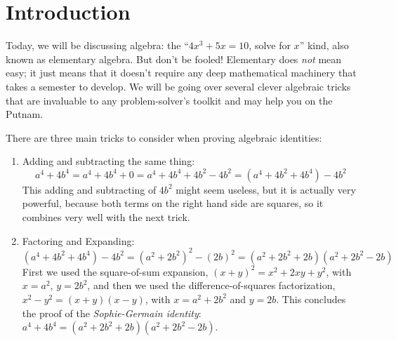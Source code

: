\documentclass{article}
\theoremstyle{definition}
\theoremstyle{remark}
\begin{document}
\section{Introduction}
Today, we will be discussing algebra: the ``$4x^3+5x=10$, solve for $x$'' kind, also known as elementary algebra. But don't be fooled! Elementary does \emph{not} mean easy; it just means that it doesn't require any deep mathematical machinery that takes a semester to develop. We will be going over several clever algebraic tricks that are invaluable to any problem-solver's toolkit and may help you on the Putnam.

There are three main tricks to consider when proving algebraic identities:
\begin{enumerate}[label=\Roman*.]
    \item Adding and subtracting the same thing: \[a^4+4b^4 = a^4 + 4b^4 + 0 = a^4 + 4b^4 + 4b^2-4b^2 = (a^4+ 4b^2 + 4b^4) - 4b^2\]
    This adding and subtracting of $4b^2$ might seem useless, but it is actually very powerful, because both terms on the right hand side are squares, so it combines very well with the next trick.
    \item Factoring and Expanding: 
    \[(a^4 + 4b^2 + 4b^4) - 4b^2 = (a^2+2b^2)^2 - (2b)^2 = (a^2 + 2b^2 + 2b)(a^2+2b^2-2b)\]
    First we used the square-of-sum expansion, $(x+y)^2 = x^2 + 2xy + y^2$, with $x=a^2$, $y=2b^2$, and then we used the difference-of-squares factorization, $x^2-y^2 = (x+y)(x-y)$, with $x=a^2+2b^2$ and $y=2b$. This concludes the proof of the \emph{Sophie-Germain identity}: $a^4+4b^4 = (a^2+2b^2 + 2b)(a^2+2b^2-2b)$.
    

\end{enumerate}
\end{document}
